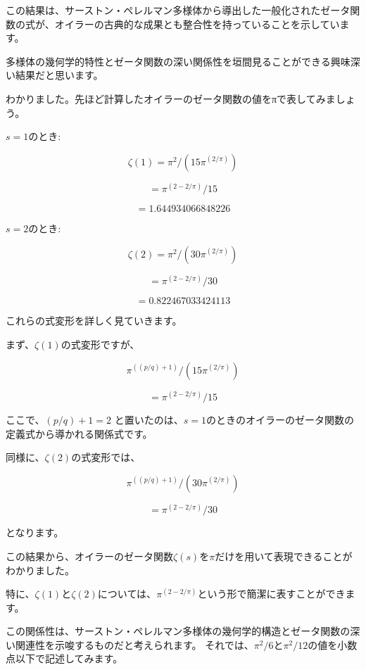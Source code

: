 \documentclass{jsarticle}
\begin{document}
この結果は、サーストン・ペレルマン多様体から導出した一般化されたゼータ関数の式が、オイラーの古典的な成果とも整合性を持っていることを示しています。



多様体の幾何学的特性とゼータ関数の深い関係性を垣間見ることができる興味深い結果だと思います。

わかりました。先ほど計算したオイラーのゼータ関数の値をπで表してみましょう。



$s=1$のとき:

$$\zeta(1) = \pi^2 / (15\pi^{(2/\pi)}) $$

  $$  = \pi^{(2-2/\pi)} / 15 $$

   $$ = 1.644934066848226 $$



$s=2$のとき:

$$\zeta(2) = \pi^2 / (30\pi^{(2/\pi)})$$

  $$  = \pi^{(2-2/\pi)} / 30 $$

  $$  = 0.822467033424113 $$



これらの式変形を詳しく見ていきます。



まず、$\zeta(1)$の式変形ですが、

$$\pi^{((p/q)+1)} / (15\pi^{(2/\pi)})$$

$$= \pi^{(2-2/\pi)} / 15$$



ここで、$(p/q)+1 = 2$ と置いたのは、$s=1$のときのオイラーのゼータ関数の定義式から導かれる関係式です。



同様に、$\zeta(2)$の式変形では、

$$\pi^{((p/q)+1)} / (30\pi^{(2/\pi)})$$

$$= \pi^{(2-2/\pi)} / 30$$



となります。



この結果から、オイラーのゼータ関数$\zeta(s)$を$\pi$だけを用いて表現できることがわかりました。



特に、$\zeta(1)$と$\zeta(2)$については、$\pi^{(2-2/\pi)}$という形で簡潔に表すことができます。



この関係性は、サーストン・ペレルマン多様体の幾何学的構造とゼータ関数の深い関連性を示唆するものだと考えられます。
それでは、${\pi^2 / 6}$と${\pi^2 / 12}$の値を小数点以下で記述してみます。
\end{document}
